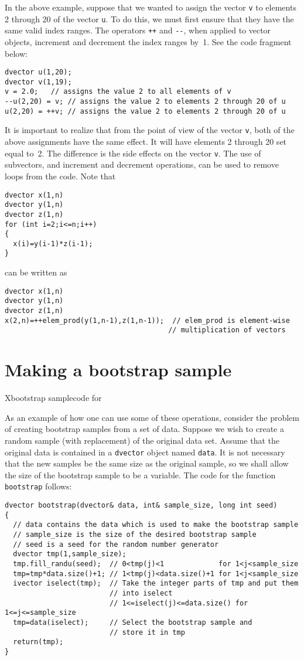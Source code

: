 \documentclass{admbmanual}
\begin{document}
In the above example, suppose that we wanted to assign the vector \texttt{v} to
elements 2 through 20 of the vector \texttt{u}. To do this, we must first ensure
that they have the same valid index ranges. The operators \texttt{++} and
\texttt{-{}-}, when applied to vector objects, increment and decrement the index
ranges by~1. See the code fragment below:
\begin{lstlisting}
dvector u(1,20);
dvector v(1,19);
v = 2.0;   // assigns the value 2 to all elements of v
--u(2,20) = v; // assigns the value 2 to elements 2 through 20 of u
u(2,20) = ++v; // assigns the value 2 to elements 2 through 20 of u
\end{lstlisting}
It is important to realize that from the point of view of the vector \texttt{v},
both of the above assignments have the same effect. It will have elements 2
through 20 set equal to~2. The difference is the side effects on the vector
\texttt{v}. The use of subvectors, and increment and decrement operations, can
be used to remove loops from the code. Note that
\begin{lstlisting}
dvector x(1,n)
dvector y(1,n)
dvector z(1,n)
for (int i=2;i<=n;i++)
{
  x(i)=y(i-1)*z(i-1);
}
\end{lstlisting}
can be written as
\begin{lstlisting}
dvector x(1,n)
dvector y(1,n)
dvector z(1,n)
x(2,n)=++elem_prod(y(1,n-1),z(1,n-1));  // elem_prod is element-wise
                                       // multiplication of vectors
\end{lstlisting}

\section{Making a bootstrap sample}
X{bootstrap sample}{code for}

As an example of how one can use some of these operations, consider the problem
of creating bootstrap samples from a set of data. Suppose we wish to create a
random sample (with replacement) of the original data set. Assume that the
original data is contained in a \texttt{dvector} object named \texttt{data}. It
is not necessary that the new samples be the same size as the original sample,
so we shall allow the size of the bootstrap sample to be a variable. The code
for the function \texttt{bootstrap} follows:
\begin{lstlisting}
dvector bootstrap(dvector& data, int& sample_size, long int seed)
{
  // data contains the data which is used to make the bootstrap sample
  // sample_size is the size of the desired bootstrap sample
  // seed is a seed for the random number generator
  dvector tmp(1,sample_size);
  tmp.fill_randu(seed);  // 0<tmp(j)<1             for 1<j<sample_size
  tmp=tmp*data.size()+1; // 1<tmp(j)<data.size()+1 for 1<j<sample_size
  ivector iselect(tmp);  // Take the integer parts of tmp and put them
                         // into iselect
                         // 1<=iselect(j)<=data.size() for 1<=j<=sample_size
  tmp=data(iselect);     // Select the bootstrap sample and
                         // store it in tmp
  return(tmp);
}
\end{lstlisting}
\end{document}
